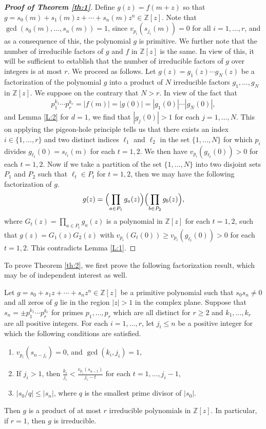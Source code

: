 \documentclass[12pt]{amsart}%
\begin{document}
\begin{proof}[\bf Proof of Theorem \ref{th:1}] Define $g(z)=f(m+z)$ so that $g=s_0(m)+s_1(m)z+\cdots+s_n(m)z^n\in \mathbb{Z}[z]$. Note that $\gcd(s_0(m),\ldots, s_n(m))=1$, since $v_{p_i}(s_{j_i}(m))=0$ for all $i=1,\ldots, r$, and as a consequence of this, the polynomial $g$ is primitive. We further note that the number of irreducible factors of $g$ and $f$ in $\mathbb{Z}[z]$ is the same. In view of this, it will be sufficient to establish that the number of irreducible factors of $g$ over integers is at most $r$. We proceed as follows.  Let $g(z)=g_1(z)\cdots g_N(z)$ be a factorization of the polynomial $g$ into a product of $N$ irreducible factors $g_1,\ldots,g_N$ in $\mathbb{Z}[z]$. We suppose on the contrary that $N>r$. In view of the fact that
\begin{eqnarray*}
p_1^{k_1}\cdots p_r^{k_r}=|f(m)|=|g(0)|=|g_1(0)|\cdots |g_N(0)|,
\end{eqnarray*}
and Lemma \ref{L:2} for $d=1$, we find that  $|g_j(0)|>1$ for each $j=1,\ldots, N$. This on applying the pigeon-hole principle tells us that there exists an index $i\in \{1,\ldots,r\}$ and two distinct indices $\ell_1$ and $\ell_2$ in the set $\{1,\ldots, N\}$ for which $p_i$ divides $g_{\ell_t}(0)=s_{\ell_t}(m)$ for each $t=1,2$. We then have $v_{p_i}(g_{\ell_t}(0))>0$ for each $t=1,2$. Now if we take a partition of the set $\{1,\ldots, N\}$ into two disjoint sets $P_1$ and $P_2$ such that $\ell_t\in P_t$  for $t=1,2$, then we may have the following factorization of $g$.
 \begin{eqnarray*}
g(z)=\Bigl(\prod_{a\in P_1}g_a(z)\Bigr)\Bigl(\prod_{b\in P_2}g_b(z)\Bigr),
  \end{eqnarray*}
  where $G_t(z)=\prod_{a\in P_t}g_a(z)$ is a polynomial  in $\mathbb{Z}[z]$ for each $t=1,2$, such that $g(z)=G_1(z)G_2(z)$ with $v_{p_i}(G_t(0))\geq v_{p_i}(g_{\ell_t}(0))>0$ for each $t=1,2$. This contradicts Lemma \ref{L:1}.
\end{proof}
To prove Theorem \ref{th:2}, we first prove the following factorization result, which may be of independent interest as well.
\begin{lemma}\label{L:4}
Let $g=s_0+s_1 z +\cdots+s_nz^n\in \mathbb{Z}[z]$ be a primitive polynomial such that $s_0s_n\neq 0$ and all zeros of $g$ lie in the region $|z|>1$ in the complex plane. Suppose that  $s_n=\pm p_1^{k_1}\cdots p_r^{k_r}$ for primes $p_1,\ldots, p_r$  which are all distinct for $r\geq 2$ and $k_1,\ldots,k_r$ are all positive integers. For each $i=1,\ldots, r$, let $j_i\leq n$ be a positive integer for which the following conditions are satisfied.
\begin{enumerate}
\item[(i)] $v_{p_i}(s_{n-j_i})=0$, and $\gcd(k_i,j_i)=1$,
\item[(ii)] If $j_i>1$, then $\frac{k_i}{j_i}<\frac{v_{p_i}(s_{n-t})}{j_i-t}$ for each $t=1,\ldots,j_i-1$,
\item[(iii)] $|s_0/q|\leq |s_n|$, where $q$ is the smallest prime divisor of $|s_0|$.
\end{enumerate}
Then $g$ is a product of at most $r$ irreducible polynomials in $\mathbb{Z}[z]$. In particular, if $r=1$, then $g$ is irreducible.
\end{lemma}
\end{document}
